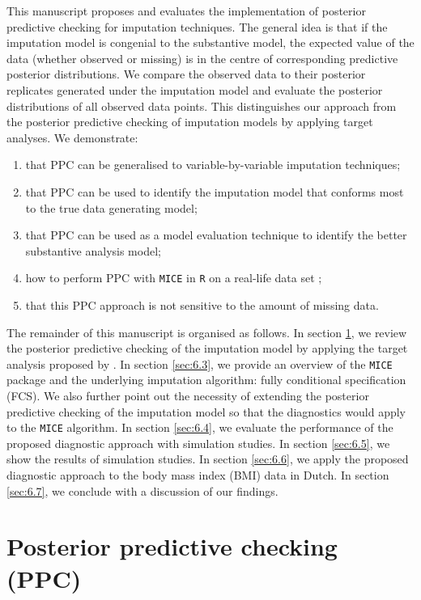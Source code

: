 	This manuscript proposes and evaluates the implementation of posterior predictive checking for imputation techniques. The general idea is that if the imputation model is congenial to the substantive model, the expected value of the data (whether observed or missing) is in the centre of corresponding predictive posterior distributions. We compare the observed data to their posterior replicates generated under the imputation model and evaluate the posterior distributions of all observed data points. This distinguishes our approach from the posterior predictive checking of imputation models by applying target analyses. We demonstrate:
	\begin{enumerate}
		\item that PPC can be generalised to variable-by-variable imputation techniques; 
		\item that PPC can be used to identify the imputation model that conforms most to the true data generating model;
		\item that PPC can be used as a model evaluation technique to identify the better substantive analysis model;
		\item how to perform PPC with \texttt{MICE} in \texttt{R} on a real-life data set \citep{Buuren2011};
		\item that this PPC approach is not sensitive to the amount of missing data.
	\end{enumerate}
	The remainder of this manuscript is organised as follows. In section \ref{sec:6.2}, we review the posterior predictive checking of the imputation model by applying the target analysis proposed by \citet{he2012diagnosing}. In section \ref{sec:6.3}, we provide an overview of the \texttt{MICE} package and the underlying imputation algorithm: fully conditional specification (FCS). We also further point out the necessity of extending the posterior predictive checking of the imputation model so that the diagnostics would apply to the \texttt{MICE} algorithm. In section \ref{sec:6.4}, we evaluate the performance of the proposed diagnostic approach with simulation studies. In section \ref{sec:6.5}, we show the results of simulation studies. In section \ref{sec:6.6}, we apply the proposed diagnostic approach to the body mass index (BMI) data in Dutch. In section \ref{sec:6.7}, we conclude with a discussion of our findings.  
	
	\section{Posterior predictive checking (PPC)}
	\label{sec:6.2}
